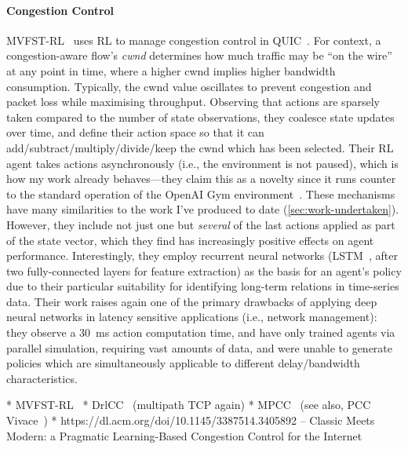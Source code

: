 \paragraph{Congestion Control}
MVFST-RL~\cite{DBLP:journals/corr/abs-1910-04054} uses RL to manage congestion control in QUIC~\cite{DBLP:conf/sigcomm/LangleyRWVKZYKS17}.
For context, a congestion-aware flow's \emph{cwnd} determines how much traffic may be ``on the wire'' at any point in time, where a higher cwnd implies higher bandwidth consumption.
Typically, the cwnd value oscillates to prevent congestion and packet loss while maximising throughput.
Observing that actions are sparsely taken compared to the number of state observations, they coalesce state updates over time, and define their action space so that it can add/subtract/multiply/divide/keep the cwnd which has been selected.
Their RL agent takes actions asynchronously (i.e., the environment is not paused), which is how my work already behaves---they claim this as a novelty since it runs counter to the standard operation of the OpenAI Gym environment~\cite{DBLP:journals/corr/BrockmanCPSSTZ16}.
These mechanisms have many similarities to the work I've produced to date (\cref{sec:work-undertaken}).
However, they include not just one but \emph{several} of the last actions applied as part of the state vector, which they find has increasingly positive effects on agent performance.
Interestingly, they employ recurrent neural networks (LSTM~\cite{DBLP:journals/neco/HochreiterS97}, after two fully-connected layers for feature extraction) as the basis for an agent's policy due to their particular suitability for identifying long-term relations in time-series data.
Their work raises again one of the primary drawbacks of applying deep neural networks in latency sensitive applications (i.e., network management): they observe a \SI{30}{\milli\second} action computation time, and have only trained agents via parallel simulation, requiring vast amounts of data, and were unable to generate policies which are simultaneously applicable to different delay/bandwidth characteristics.

* MVFST-RL~\parencite{DBLP:journals/corr/abs-1910-04054}
* DrlCC~\parencite{DBLP:journals/jsac/XuTYWX19} (multipath TCP again)
* MPCC~\parencite{DBLP:conf/conext/GiladSGRS20} (see also, PCC Vivace~\parencite{DBLP:conf/nsdi/DongLZGS15,DBLP:conf/nsdi/DongMZAGGS18})
* https://dl.acm.org/doi/10.1145/3387514.3405892 -- Classic Meets Modern: a Pragmatic Learning-Based Congestion Control for the Internet

